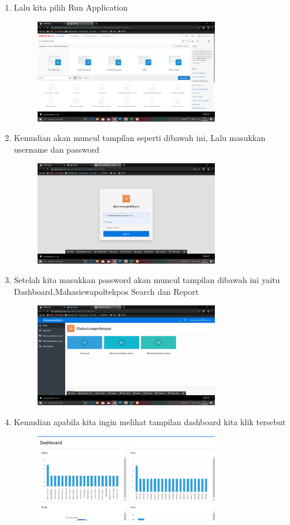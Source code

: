 \documentclass{article}
\begin{document}
\begin{enumerate}
\begin{figure}[h]
    \end{figure}
    \item Lalu kita pilih Run Application
    \begin{figure}[h]
    \centerline{\includegraphics[width=8cm]{image/20.png}}
    \end{figure}
    \newpage \item Kemudian akan muncul tampilan seperti dibawah ini, Lalu masukkan username dan password
    \begin{figure}[h]
    \centerline{\includegraphics[width=8cm]{image/21.png}}
    \end{figure}
    \newpage \item Setelah kita masukkan password akan muncul tampilan dibawah ini yaitu Dashboard,Mahasiswapoltekpos Search dan Report
    \begin{figure}[h]
    \centerline{\includegraphics[width=8cm]{image/22.png}}
    \end{figure}
    \item Kemudian apabila kita ingin melihat tampilan dashboard kita klik tersebut
    \begin{figure}[h]
    \centerline{\includegraphics[width=8cm]{image/dashboard.PNG}}

\end{figure}
\end{enumerate}
\end{document}

